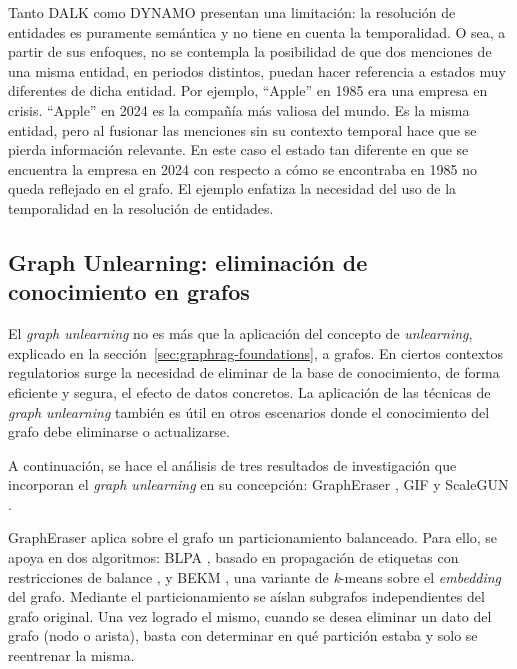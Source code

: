 Tanto DALK como DYNAMO presentan una limitación: la resolución de entidades es puramente semántica y no tiene en cuenta la temporalidad. O sea, a partir de sus enfoques, no se contempla la posibilidad de que dos menciones de una misma entidad, en periodos distintos, puedan hacer referencia a estados muy diferentes de dicha entidad. Por ejemplo, ``Apple'' en 1985 era una empresa en crisis. ``Apple'' en 2024 es la compañía más valiosa del mundo. Es la misma entidad, pero al fusionar las menciones sin su contexto temporal hace que se pierda información relevante. En este caso el estado tan diferente en que se encuentra la empresa en 2024 con respecto a cómo se encontraba en 1985 no queda reflejado en el grafo. El ejemplo enfatiza la necesidad del uso de la temporalidad en la resolución de entidades.

\subsection{Graph Unlearning: eliminación de conocimiento en grafos}\label{subsec:graph-unlearning}

El \emph{graph unlearning} no es más que la aplicación del concepto de \emph{unlearning}, explicado en la sección~\ref{sec:graphrag-foundations}, a grafos. En ciertos contextos regulatorios surge la necesidad de eliminar de la base de conocimiento, de forma eficiente y segura, el efecto de datos concretos. La aplicación de las técnicas de \emph{graph unlearning} también es útil en otros escenarios donde el conocimiento del grafo debe eliminarse o actualizarse.

A continuación, se hace el análisis de tres resultados de investigación que incorporan el \emph{graph unlearning} en su concepción: GraphEraser \cite{graph_unlearning2022}, GIF \cite{gif2023} y ScaleGUN \cite{scalegun2025}.

GraphEraser aplica sobre el grafo un particionamiento balanceado. Para ello, se apoya en dos algoritmos: BLPA \cite{ugander2013blpa}, basado en propagación de etiquetas con restricciones de balance \cite{zhu2002labelpropagation}, y BEKM \cite{graph_unlearning2022}, una variante de \emph{k}-means \cite{kanungo2002kmeans} sobre el \emph{embedding} del grafo. Mediante el particionamiento se aíslan subgrafos independientes del grafo original. Una vez logrado el mismo, cuando se desea eliminar un dato del grafo (nodo o arista), basta con determinar en qué partición estaba y solo se reentrenar la misma.

